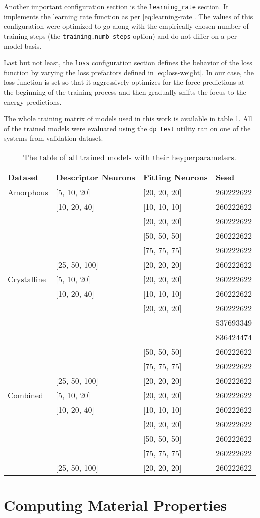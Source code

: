 Another important configuration section is the \texttt{learning\_rate}
section. It implements the learning rate function as per
\eqref{eq:learning-rate}. The values of this configuration were optimized to
go along with the empirically chosen number of training steps
(the \texttt{training.numb\_steps} option) and do not differ on a per-model
basis.

Last but not least, the \texttt{loss} configuration section defines the
behavior of the loss function by varying the loss prefactors defined in
\eqref{eq:loss-weight}. In our case, the loss function is set so that it
aggressively optimizes for the force predictions at the beginning of the
training process and then gradually shifts the focus to the energy
predictions.

The whole training matrix of models used in this work is available in table
\ref{tab:models}. All of the trained models were evaluated using the
\texttt{dp test} utility ran on one of the systems from validation dataset.

\begin{table}
  \begin{tabularx}{\textwidth}{llll}
    \toprule
    Dataset & Descriptor Neurons & Fitting Neurons & Seed \\
    \midrule
    Amorphous & [5, 10, 20] & [20, 20, 20] & 260222622 \\
     & [10, 20, 40] & [10, 10, 10] & 260222622 \\
     & & [20, 20, 20] & 260222622 \\
     & & [50, 50, 50] & 260222622 \\
     & & [75, 75, 75] & 260222622 \\
     & [25, 50, 100] & [20, 20, 20] & 260222622 \\
    \midrule
    Crystalline & [5, 10, 20] & [20, 20, 20] & 260222622 \\
     & [10, 20, 40] & [10, 10, 10] & 260222622 \\
     & & [20, 20, 20] & 260222622 \\
     & & & 537693349 \\
     & & & 836424474 \\
     & & [50, 50, 50] & 260222622 \\
     & & [75, 75, 75] & 260222622 \\
     & [25, 50, 100] & [20, 20, 20] & 260222622 \\
    \bottomrule
    Combined & [5, 10, 20] & [20, 20, 20] & 260222622 \\
     & [10, 20, 40] & [10, 10, 10] & 260222622 \\
     & & [20, 20, 20] & 260222622 \\
     & & [50, 50, 50] & 260222622 \\
     & & [75, 75, 75] & 260222622 \\
     & [25, 50, 100] & [20, 20, 20] & 260222622 \\
  \end{tabularx}
  \caption{The table of all trained models with their heyperparameters.}
  \label{tab:models}
\end{table}

\section{Computing Material Properties}

